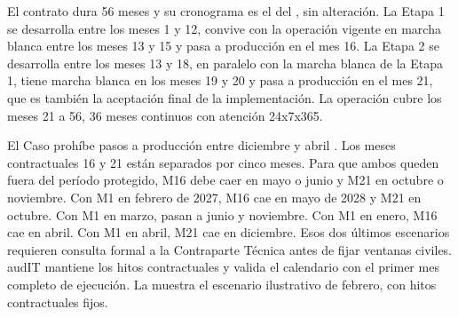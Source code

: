 El contrato dura 56 meses y su cronograma es el del , sin alteración. La Etapa 1 se
desarrolla entre los meses 1 y 12, convive con la operación vigente en marcha blanca entre los meses 13
y 15 y pasa a producción en el mes 16. La Etapa 2 se desarrolla entre los meses 13 y 18, en paralelo
con la marcha blanca de la Etapa 1, tiene marcha blanca en los meses 19 y 20 y pasa a producción en el
mes 21, que es también la aceptación final de la implementación. La operación cubre los meses 21 a 56,
36 meses continuos con atención 24x7x365.

El Caso prohíbe pasos a producción entre diciembre y abril . Los meses
contractuales 16 y 21 están separados por cinco meses. Para que ambos queden fuera del período
protegido, M16 debe caer en mayo o junio y M21 en octubre o noviembre. Con M1 en febrero de 2027,
M16 cae en mayo de 2028 y M21 en octubre. Con M1 en marzo, pasan a junio y noviembre. Con M1 en
enero, M16 cae en abril. Con M1 en abril, M21 cae en diciembre. Esos dos últimos escenarios
requieren consulta formal a la Contraparte Técnica antes de fijar ventanas civiles. audIT mantiene
los hitos contractuales y valida el calendario con el primer mes completo de ejecución. La
muestra el escenario ilustrativo de febrero, con hitos contractuales fijos.

